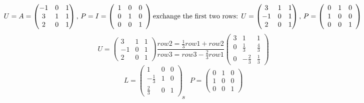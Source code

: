 \documentclass[]{article}
\begin{document}

\iffalse{} {Solution. } \fi{}\[
U = A = \begin{pmatrix}-1 & 0 & 1 \\
3 & 1 & 1 \\
2 & 0 & 1 
\end{pmatrix}\text{, } P = I =\left(\begin{array}{ccc}{1} & {0} & {0} \\ {0} & {1} & {0} \\ {0} & {0} & {1}\end{array}\right) \\
\text{exchange the first two rows: }U  = \begin{pmatrix}3 & 1 & 1 \\-1 & 0 & 1 \\
2 & 0 & 1 
\end{pmatrix} \text{, } P  =\left(\begin{array}{ccc}{0} & {1} & {0} \\ {1} & {0} & {0} \\ {0} & {0} & {1}\end{array}\right)\\
\] \[
U = \left(\begin{array}{ccc}{3} & {1} & {1} \\ {-1} & {0} & {1} \\ {2} & {0} & {1}\end{array}\right) \frac{row2=\frac{1}{3} row1+row2}{row3=row3-\frac{2}{3} row1}\left(\begin{array}{rrr}{3} & {1} & {1} \\ {0} & {\frac{1}{3}} & {\frac{4}{3}} \\ {0} & {-\frac{2}{3}} & {\frac{1}{3}}\end{array}\right)
\] \[
L=\left(\begin{array}{ccc}{1} & {0} & {0} \\ {-\frac{1}{3}} & {1} & {0} \\ {\frac{2}{3}} & {0} & {1}\end{array}\right) \quad P=\left(\begin{array}{ccc}{0} & {1} & {0} \\ {1} & {0} & {0} \\ {0} & {0} & {1}\end{array}\right)
\] \[
s
\]

\end{document}
